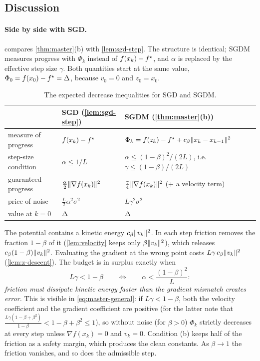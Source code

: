 \subsection{Discussion}

\paragraph{Side by side with SGD.}  compares
\cref{thm:master}(b) with \cref{lem:sgd-step}. The structure is identical; SGDM measures
progress with $\Phi_k$ instead of $f(x_k)-f^\star$, and $\alpha$ is replaced by the effective
step size $\gamma$. Both quantities start at the same value, $\Phi_0=f(x_0)-f^\star=\Delta$,
because $v_0=0$ and $z_0=x_0$.

\begin{table}[ht]
\centering\small
\renewcommand{\arraystretch}{1.3}
\begin{tabular}{@{}lll@{}}
\toprule
 & SGD (\cref{lem:sgd-step}) & SGDM (\cref{thm:master}(b))\\
\midrule
measure of progress & $f(x_k)-f^\star$ & $\Phi_k=f(z_k)-f^\star+c_\beta\lVert x_k-x_{k-1}\rVert^2$\\
step-size condition & $\alpha\le1/L$ & $\alpha\le(1-\beta)^2/(2L)$, i.e.\ $\gamma\le(1-\beta)/(2L)$\\
guaranteed progress & $\frac\alpha2\lVert \nabla f(x_k)\rVert^2$ & $\frac\gamma4\lVert \nabla f(x_k)\rVert^2$ (+ a velocity term)\\
price of noise & $\frac L2\alpha^2\sigma^2$ & $L\gamma^2\sigma^2$\\
value at $k=0$ & $\Delta$ & $\Delta$\\
\bottomrule
\end{tabular}
\caption{The expected decrease inequalities for SGD and SGDM.}
\label{tab:side-by-side}
\end{table}

\begin{tcolorbox}[intuition,title=Where the step-size condition comes from: an energy budget]
The potential contains a kinetic energy $c_\beta\lVert v_k\rVert^2$. In each step friction removes
the fraction $1-\beta$ of it (\cref{lem:velocity} keeps only $\beta\lVert v_k\rVert^2$), which
releases $c_\beta(1-\beta)\lVert v_k\rVert^2$. Evaluating the gradient at the wrong point costs
$L\gamma\,c_\beta\lVert v_k\rVert^2$ (\cref{lem:z-descent}). The budget is in surplus exactly when
\[
  L\gamma<1-\beta\qquad\Longleftrightarrow\qquad\alpha<\frac{(1-\beta)^2}{L}:
\]
\emph{friction must dissipate kinetic energy faster than the gradient mismatch creates
error.} This is visible in \eqref{eq:master-general}: if $L\gamma<1-\beta$, both the
velocity coefficient and the gradient coefficient are positive (for the latter note that
$\frac{L\gamma(1-\beta+\beta^2)}{1-\beta}<1-\beta+\beta^2\le1$), so without noise
(for $\beta>0$) $\Phi_k$ strictly decreases at every step unless $\nabla f(x_k)=0$ and
$v_k=0$. Condition (b)
keeps half of the friction as a safety margin, which produces the clean constants. As
$\beta\to1$ the friction vanishes, and so does the admissible step.
\end{tcolorbox}

